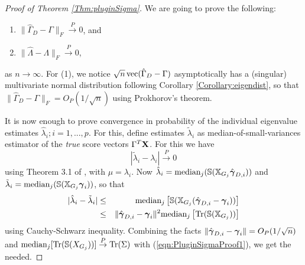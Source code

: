 \begin{proof}[Proof of Theorem \ref{Thm:pluginSigma}]
We are going to prove the following:
%
\begin{enumerate}
\item $\| \hat\Gamma_D - \Gamma \|_F \stackrel{P}{\rightarrow} 0$, and

\item $\| \hat\Lambda - \Lambda \|_F \stackrel{P}{\rightarrow} 0$,
\end{enumerate}
%
as $n \rightarrow \infty$. For (1), we notice $\sqrt n \operatorname*{vec} ( \hat\Gamma_D - \Gamma)$ asymptotically has a (singular) multivariate normal distribution following Corollary \ref{Corollary:eigendist}, so that $\| \hat\Gamma_D - \Gamma \|_F = O_P(1/\sqrt n)$ using Prokhorov's theorem.

It is now enough to prove convergence in probability of the individual eigenvalue estimates $\hat\lambda_i; i = 1,...,p$. For this, define estimates $\tilde\lambda_i$ as median-of-small-variances estimator of the \textit{true} score vectors $\Gamma^T {\mathbf{X}}$. For this we have
%
\begin{equation}\label{eqn:PluginSigmaProof1}
| \tilde\lambda_i - \lambda_i | \stackrel{P}{\rightarrow} 0
\end{equation}
%
using Theorem 3.1 of \cite{Minsker15}, with $\mu = \lambda_i$. Now $ \hat\lambda_i = \text{median}_j ( {\mathbb{S}} ( {\mathbb{X}}_{G_j} \hat{{\boldsymbol{\gamma}}}_{D,i} ))$ and $\tilde\lambda_i = \text{median}_j ( {\mathbb{S}}( {\mathbb{X}}_{G_j} {\boldsymbol{\gamma}}_i )) $, so that
%
\begin{eqnarray*}
| \hat\lambda_i - \tilde\lambda_i | &\leq & \text{median}_j \left[ {\mathbb{S}}( {\mathbb{X}}_{G_j} ( \hat{{\boldsymbol{\gamma}}}_{D,i} - {\boldsymbol{\gamma}}_i) ) \right]
\\ &\leq & \| \hat{{\boldsymbol{\gamma}}}_{D,i} - {\boldsymbol{\gamma}}_i \|^2 \text{median}_j  \left[ \text{Tr} ( {\mathbb{S}}( {\mathbb{X}}_{G_j}) ) \right]
\end{eqnarray*}
%
using Cauchy-Schwarz inequality. Combining the facts $ \| \hat{{\boldsymbol{\gamma}}}_{D,i} - {\boldsymbol{\gamma}}_i \| = O_P(1/\sqrt n)$ and $ \text{median}_j  [ \text{Tr} ({\mathbb{S}} ( X_{G_j})) ] \stackrel{P}{\rightarrow} \text{Tr}(\Sigma)$ \citep{Minsker15} with (\ref{eqn:PluginSigmaProof1}), we get the needed.

\end{proof}

